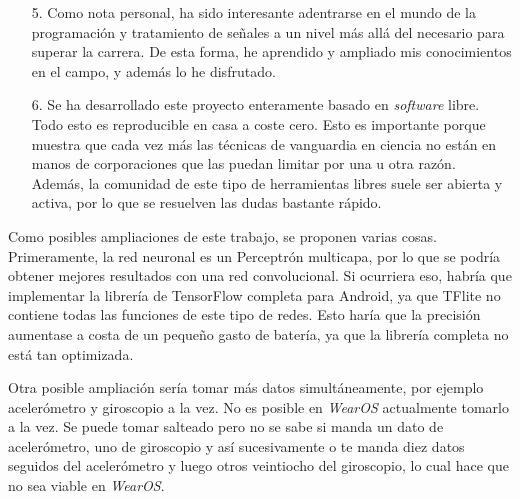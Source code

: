 \documentclass[12pt]{book}
\numberwithin{equation}{section}
\begin{document}
\begin{enumerate}
\item[5.] Como nota personal, ha sido interesante adentrarse en el mundo de la programación y tratamiento de señales a un nivel más allá del necesario para superar la carrera. De esta forma, he aprendido y ampliado mis conocimientos en el campo, y además lo he disfrutado.

\item[6.] Se ha desarrollado este proyecto enteramente basado en \textit{software} libre. Todo esto es reproducible en casa a coste cero. Esto es importante porque muestra que cada vez más las técnicas de vanguardia en ciencia no están en manos de corporaciones que las puedan limitar por una u otra razón. Además, la comunidad de este tipo de herramientas libres suele ser abierta y activa, por lo que se resuelven las dudas bastante rápido.
\end{enumerate}

Como posibles ampliaciones de este trabajo, se proponen varias cosas. Primeramente, la red neuronal es un Perceptrón multicapa, por lo que se podría obtener mejores resultados con una red convolucional. Si ocurriera eso, habría que implementar la librería de TensorFlow completa para Android, ya que TFlite no contiene todas las funciones de este tipo de redes. Esto haría que la precisión aumentase a costa de un pequeño gasto de batería, ya que la librería completa no está tan optimizada.

Otra posible ampliación sería tomar más datos simultáneamente, por ejemplo acelerómetro y giroscopio a la vez. No es posible en \textit{WearOS} actualmente tomarlo a la vez. Se puede tomar salteado pero no se sabe si manda un dato de acelerómetro, uno de giroscopio y así sucesivamente o te manda diez datos seguidos del acelerómetro y luego otros veintiocho del giroscopio, lo cual hace que no sea viable en \textit{WearOS}.





\newpage


\end{document}
